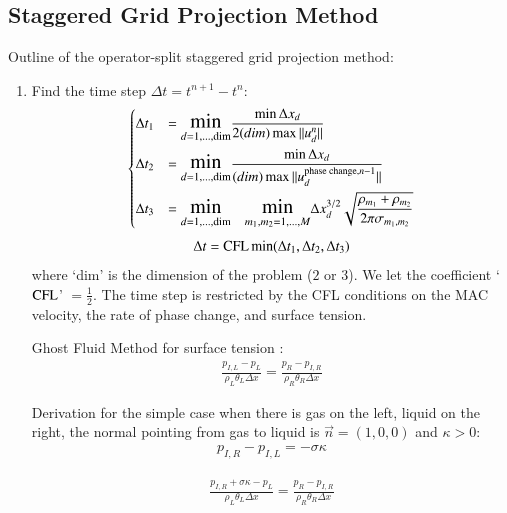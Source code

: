 \documentclass[preprint,12pt]{Definitions/elsarticle}
\newcommand{\tn}{\textnormal}
\begin{document}
\FloatBarrier
\subsection{Staggered Grid Projection Method}
Outline of the operator-split staggered grid projection method:
\begin{enumerate}
	\item Find the time step $\Delta t=t^{n+1}-t^{n}$:
	\begin{equation}
	\begin{dcases}
	\Delta t_{1}&=\mathlarger{\mathlarger{\min}}_{d=1,\ldots,\tn{dim}}
	\frac{\min \Delta x_{d}}{2 (dim) \max||u_{d}^{n}||} \\	
	\Delta t_{2}&=\mathlarger{\mathlarger{\min}}_{d=1,\ldots,\tn{dim}}
	\frac{\min\Delta x_{d}}{(dim)\max||u_{d}^{\tn{phase change},n-1}||} \\
	\Delta t_{3}&=\mathlarger{\mathlarger{\min}}_{d=1,\ldots,\tn{dim}} \quad
	\mathlarger{\mathlarger{\min}}_{m_1,m_2=1,\ldots,M}
	\Delta x_{d}^{3/2}
	\sqrt{\frac{\rho_{m_1}+\rho_{m_2}}
		{2\pi\sigma_{m_1,m_2}}} 
	\end{dcases}
	\label{stiffconstraint}
	\end{equation}
	\begin{equation}
	\Delta t = \tn{CFL} \min(\Delta t_{1},\Delta t_{2},\Delta t_{3})
	\end{equation}
	where `dim' is the dimension of the problem ($2$ or $3$). We let the coefficient `$\tn{CFL}$' $= \frac{1}{2}$. The time step is restricted by the CFL conditions on the MAC velocity, the rate of phase change, and surface tension.\\



\newpage
\par\noindent
Ghost Fluid Method for surface tension \cite{kang2000boundary}:
\begin{eqnarray*}
\frac{p_{I,L}-p_{L}}{\rho_{L}\theta_{L}\Delta x}=
\frac{p_{R}-p_{I,R}}{\rho_{R}\theta_{R}\Delta x}
\end{eqnarray*}
\par\noindent
Derivation for the simple case when there is
gas on the left, liquid on the right, the normal pointing from gas to liquid is
$\vec{n}=(1,0,0)$ and $\kappa>0$:
\begin{eqnarray*}
p_{I,R}-p_{I,L}=-\sigma\kappa 
\end{eqnarray*}

\begin{eqnarray*}
\frac{p_{I,R}+\sigma\kappa-p_{L}}{\rho_{L}\theta_{L}\Delta x}=
\frac{p_{R}-p_{I,R}}{\rho_{R}\theta_{R}\Delta x}
\end{eqnarray*}


\end{enumerate}
\end{document}
